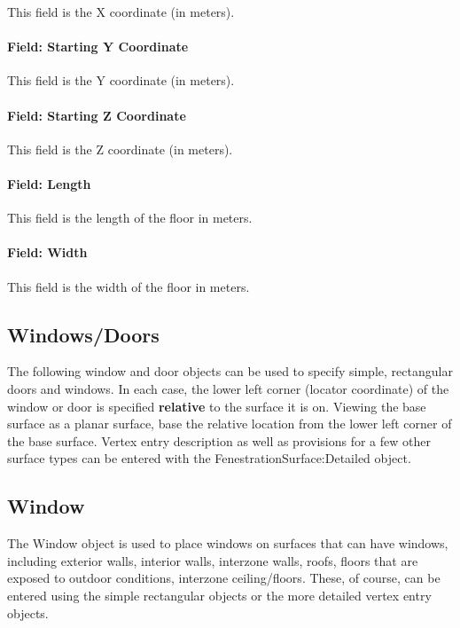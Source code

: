 This field is the X coordinate (in meters).

\paragraph{Field: Starting Y Coordinate}\label{field-starting-y-coordinate-9}

This field is the Y coordinate (in meters).

\paragraph{Field: Starting Z Coordinate}\label{field-starting-z-coordinate-9}

This field is the Z coordinate (in meters).

\paragraph{Field: Length}\label{field-length-9}

This field is the length of the floor in meters.

\paragraph{Field: Width}\label{field-width-5}

This field is the width of the floor in meters.

\subsection{Windows/Doors}\label{windowsdoors}

The following window and door objects can be used to specify simple, rectangular doors and windows. In each case, the lower left corner (locator coordinate) of the window or door is specified \textbf{relative} to the surface it is on. Viewing the base surface as a planar surface, base the relative location from the lower left corner of the base surface. Vertex entry description as well as provisions for a few other surface types can be entered with the FenestrationSurface:Detailed object.

\subsection{Window}\label{window}

The Window object is used to place windows on surfaces that can have windows, including exterior walls, interior walls, interzone walls, roofs, floors that are exposed to outdoor conditions, interzone ceiling/floors. These, of course, can be entered using the simple rectangular objects or the more detailed vertex entry objects.

